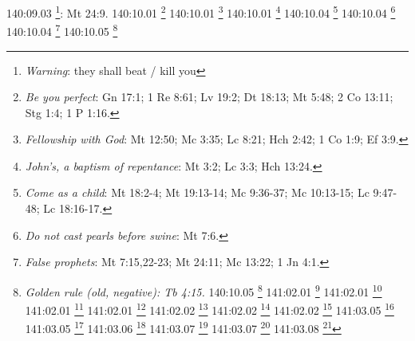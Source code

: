{{{{{{{{{{{{{{{{{{{{{{{{{{{140:09.03 \footnote{\textit{Warning}: they shall beat / kill you}: Mt 24:9.}
140:10.01 \footnote{\textit{Be you perfect}: Gn 17:1; 1 Re 8:61; Lv 19:2; Dt 18:13; Mt 5:48; 2 Co 13:11; Stg 1:4; 1 P 1:16.}
140:10.01 \footnote{\textit{Fellowship with God}: Mt 12:50; Mc 3:35; Lc 8:21; Hch 2:42; 1 Co 1:9; Ef 3:9.}
140:10.01 \footnote{\textit{John's, a baptism of repentance}: Mt 3:2; Lc 3:3; Hch 13:24.}
140:10.04 \footnote{\textit{Come as a child}: Mt 18:2-4; Mt 19:13-14; Mc 9:36-37; Mc 10:13-15; Lc 9:47-48; Lc 18:16-17.}
140:10.04 \footnote{\textit{Do not cast pearls before swine}: Mt 7:6.}
140:10.04 \footnote{\textit{False prophets}: Mt 7:15,22-23; Mt 24:11; Mc 13:22; 1 Jn 4:1.}
140:10.05 \footnote{\textit{Golden rule (old, negative): Tb 4:15.}
140:10.05 \footnote{\textit{Golden rule restated}: Mt 7:12; Lc 6:31.}
141:02.01 \footnote{\textit{King David's throne}: Lc 1:32.}
141:02.01 \footnote{\textit{Kingdom of God already here}: Mc 1:14-15; Lc 4:43; Lc 10:9,11; Lc 17:21; Lc 21:29-32; Jn 3:3,5.}
141:02.01 \footnote{\textit{Kingdom of heaven already here}: Mt 3:2; Mt 4:17,23; Mt 6:33; Mt 9:35; Mt 10:7; Mt 24:14.}
141:02.01 \footnote{\textit{Spirit of God within us}: Job 32:8,18; Is 63:10-11; Ez 37:14; Mt 10:20; Lc 17:20-21; Jn 17:21-23; Ro 8:9-11; 1 Co 3:16-17; 1 Co 6:19; 2 Co 6:16; Gl 2:20; 1 Jn 3:24; 1 Jn 4:12-15; Ap 21:3.}
141:02.02 \footnote{\textit{Faith-sons of God}: 1 Cr 22:10; Sal 2:7; Is 56:5; Mt 5:9,16,45; Lc 20:36; Jn 1:12-13; Jn 11:52; Hch 17:28-29; Ro 8:14-17,19,21; Ro 9:26; 2 Co 6:18; Gl 3:26; Gl 4:5-7; Ef 1:5; Flp 2:15; Heb 12:5-8; 1 Jn 3:1-2,10; 1 Jn 5:2; Ap 21:7; 2 Sam 7:14.}
141:02.02 \footnote{\textit{Father's will becomes your will}: Sal 143:10; Eclo 15:11-20; Mt 6:10; Mt 7:21; Mt 12:50; Mc 3:35; Lc 8:21; Lc 11:2; Jn 7:16-17; Jn 9:31; Jn 14:21-24; Jn 15:10,14-16.}
141:02.02 \footnote{\textit{Gospel of the Kingdom}: Mt 4:23; Mt 9:35; Mt 24:14; Mc 1:14-15.}
141:03.05 \footnote{\textit{Gospel of Divine Sonship}: Mt 8:29; Mt 14:33; Mt 16:15-16; Mt 27:54; Mc 1:1; Mc 3:11; Mc 15:39; Lc 1:35; Lc 4:41; Jn 1:34,49; Jn 3:16-18; Jn 10:36; Jn 20:31; Hch 8:37.}
141:03.05 \footnote{\textit{People called him "Master"}: Mc 9:38; Mc 13:1; Lc 5:5; Jn 4:31.}
141:03.06 \footnote{\textit{Jesus went about doing good}: Hch 10:38.}
141:03.07 \footnote{\textit{Come to me for rest}: Mt 11:28.}
141:03.07 \footnote{\textit{Yoke is easy}: Mt 11:29-30.}
141:03.08 \footnote{\textit{Resist not evil (forgive it): Mt 5:39-42; Lc 6:28-31.}
141:04.01 \footnote{\textit{God as father of Jewish nation}: Is 63:16; Is 64:8.}
141:04.01 \footnote{\textit{Jews saw God as king over all}: Sal 22:27; Is 2:2-5; Dn 2:44; Zac 14:7; Mal 1:14.}
}}}}}}}}}}}}}}}}}}}}}}}}}}}}
